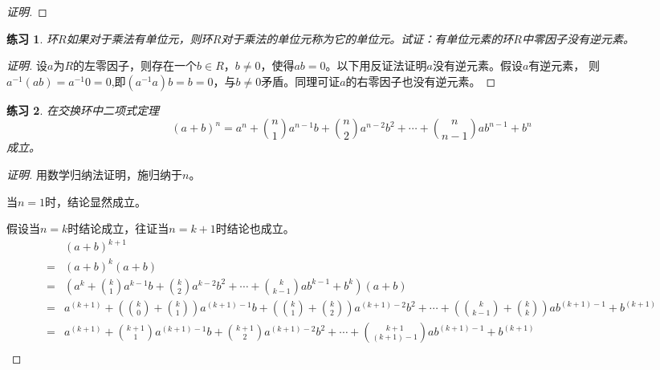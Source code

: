 \documentclass{article}
\newtheorem{Exercise}{练习}
\begin{document}
\begin{CJK*}{UTF8}{gbsn}
\begin{proof}[证明]
\end{proof}
\begin{Exercise}
  环$R$如果对于乘法有单位元，则环$R$对于乘法的单位元称为它的单位元。试证：有单位元素的环$R$中零因子没有逆元素。
\end{Exercise}
\begin{proof}[证明]
  设$a$为$R$的左零因子，则存在一个$b\in R$，$b\neq 0$，使得$ab=0$。以下用反证法证明$a$没有逆元素。假设$a$有逆元素，
  则$a^{-1}(ab)=a^{-1}0=0$,即$(a^{-1}a)b=b=0$，与$b\neq 0$矛盾。同理可证$a$的右零因子也没有逆元素。
\end{proof}
\begin{Exercise}
  在交换环中二项式定理
\[(a+b)^n=a^n+\binom{n}{1}a^{n-1}b+\binom{n}{2}a^{n-2}b^2+\cdots+\binom{n}{n-1}ab^{n-1}+b^n\]
  成立。
\end{Exercise}
\begin{proof}[证明]
用数学归纳法证明，施归纳于$n$。

当$n=1$时，结论显然成立。

假设当$n=k$时结论成立，往证当$n=k+1$时结论也成立。
\begin{align*}
  &(a+b)^{k+1}\\
  =&(a+b)^k(a+b)\\
  =&(a^k+\binom{k}{1}a^{k-1}b+\binom{k}{2}a^{k-2}b^2+\cdots+\binom{k}{k-1}ab^{k-1}+b^k)(a+b)\\
  =&a^{(k+1)}+(\binom{k}{0}+\binom{k}{1})a^{(k+1)-1}b+(\binom{k}{1}+\binom{k}{2})a^{(k+1)-2}b^2+\cdots+(\binom{k}{k-1}+\binom{k}{k})ab^{(k+1)-1}+b^{(k+1)}\\
  =&a^{(k+1)}+\binom{k+1}{1}a^{(k+1)-1}b+\binom{k+1}{2}a^{(k+1)-2}b^2+\cdots+\binom{k+1}{(k+1)-1}ab^{(k+1)-1}+b^{(k+1)}\\
\end{align*}
\end{proof}
\end{CJK*}
\end{document}
